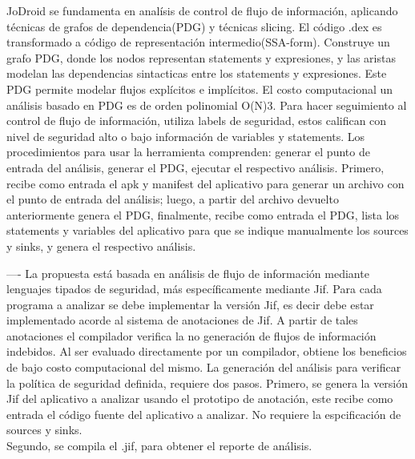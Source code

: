 JoDroid se fundamenta en analísis de control de flujo de información, aplicando
técnicas de grafos de dependencia(PDG) y técnicas slicing.\newline 
El código .dex es transformado a código de representación intermedio(SSA-form).
Construye un grafo PDG, donde los nodos representan statements y expresiones, y
las aristas modelan las dependencias sintacticas entre los statements y
expresiones. Este PDG permite modelar flujos explícitos e implícitos.\newline
El costo computacional un análisis basado en PDG es de orden polinomial
O(N)3\cite[page 3]{FCO-PDG}.\newline 
Para hacer seguimiento al control de flujo de información, utiliza labels de
seguridad, estos califican con nivel de seguridad alto o bajo información de
variables y statements.\newline
Los procedimientos para usar la herramienta comprenden: generar el punto de
entrada del análisis, generar el PDG, ejecutar el respectivo análisis. Primero,
recibe como entrada el apk y manifest del aplicativo para generar un archivo con
el punto de entrada del análisis; luego, a partir del archivo devuelto
anteriormente genera el PDG, finalmente, recibe como entrada el PDG, lista los
statements y variables del aplicativo para que se indique manualmente los
sources y sinks, y genera el respectivo análisis.\newline

---- \newline
La propuesta está basada en análisis de flujo de información mediante lenguajes
tipados de seguridad, más específicamente mediante Jif.\newline
Para cada programa a analizar se debe implementar la versión Jif, es decir debe
estar implementado acorde al sistema de anotaciones de Jif. A partir de tales
anotaciones el compilador verifica la no generación de flujos de información
indebidos. Al ser evaluado directamente por un compilador, obtiene los
beneficios de bajo costo computacional del mismo.\newline
La generación del análisis para verificar la política de seguridad
definida, requiere dos pasos. Primero, se genera la versión Jif del aplicativo a
analizar usando el prototipo de anotación, este recibe como entrada el
código fuente del aplicativo a analizar. No requiere la espcificación de sources
y sinks.\\
Segundo, se compila el .jif, para obtener el reporte de análisis.






